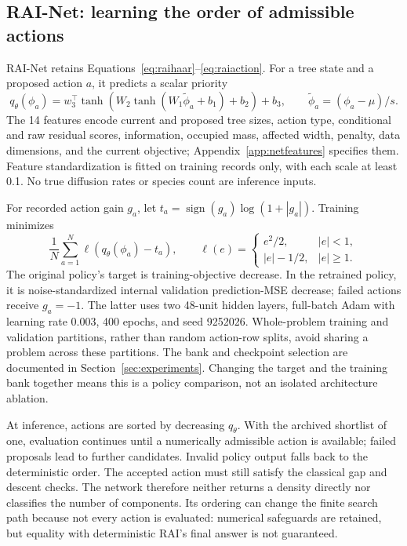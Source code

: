 \subsection{RAI-Net: learning the order of admissible actions}\label{sec:rainetmath}
RAI-Net retains Equations~\eqref{eq:raihaar}--\eqref{eq:raiaction}. For a tree state and a proposed action $a$, it predicts a scalar priority
\begin{equation}\label{eq:rainet}
 q_\theta(\phi_a)=w_3^\top\tanh\!\left(W_2\tanh(W_1\widetilde\phi_a+b_1)+b_2\right)+b_3,
 \qquad \widetilde\phi_a=(\phi_a-\mu)/s.
\end{equation}
The 14 features encode current and proposed tree sizes, action type, conditional and raw residual scores, information, occupied mass, affected width, penalty, data dimensions, and the current objective; Appendix~\ref{app:netfeatures} specifies them. Feature standardization is fitted on training records only, with each scale at least 0.1. No true diffusion rates or species count are inference inputs.

For recorded action gain $g_a$, let $t_a=\operatorname{sign}(g_a)\log(1+|g_a|)$. Training minimizes
\begin{equation}\label{eq:netloss}
 \frac1N\sum_{a=1}^N\ell(q_\theta(\phi_a)-t_a),\qquad
 \ell(e)=\begin{cases}e^2/2,&|e|<1,\\|e|-1/2,&|e|\geq1.\end{cases}
\end{equation}
The original policy's target is training-objective decrease. In the retrained policy, it is noise-standardized internal validation prediction-MSE decrease; failed actions receive $g_a=-1$. The latter uses two 48-unit hidden layers, full-batch Adam with learning rate 0.003, 400 epochs, and seed 9252026. Whole-problem training and validation partitions, rather than random action-row splits, avoid sharing a problem across these partitions. The bank and checkpoint selection are documented in Section~\ref{sec:experiments}. Changing the target and the training bank together means this is a policy comparison, not an isolated architecture ablation.

At inference, actions are sorted by decreasing $q_\theta$. With the archived shortlist of one, evaluation continues until a numerically admissible action is available; failed proposals lead to further candidates. Invalid policy output falls back to the deterministic order. The accepted action must still satisfy the classical gap and descent checks. The network therefore neither returns a density directly nor classifies the number of components. Its ordering can change the finite search path because not every action is evaluated: numerical safeguards are retained, but equality with deterministic RAI's final answer is not guaranteed.

